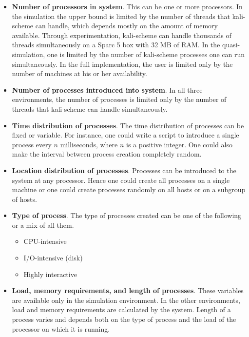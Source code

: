 \documentclass{report}
\begin{document}
\begin{itemize}

	\item \textbf{Number of processors in system}.  This can be one or more
	processors.  In the simulation the upper bound is limited by the
	number of threads that kali-scheme can handle, which depends mostly
	on the amount of memory available.  Through experimentation, 
	kali-scheme can handle thousands of threads simultaneously on a
	Sparc 5 box with 32 MB of RAM.  In the quasi-simulation, one is
	limited by the number of kali-scheme processes one can run
	simultaneously.  In the full implementation, the user is limited only
	by the number of machines at his or her availability.

	\item \textbf{Number of processes introduced into system}.  In all
	three environments, the number of processes is limited only by the
	number of threads that kali-scheme can handle simultaneously.

	\item \textbf{Time distribution of processes}.  The time distribution
	of processes can be fixed or variable.  For instance, one could
	write a script to introduce a single process every $n$ milliseconds,
	where $n$ is a positive integer.  One could also make the interval
	between process creation completely random.

	\item \textbf{Location distribution of processes}.  Processes can be
	introduced to the system at any processor.  Hence one could create
	all processes on a single machine or one could create processes
	randomly on all hosts or on a subgroup of hosts.

	\item \textbf{Type of process}.  The type of processes created can
	be one of the following or a mix of all them.

	\begin{itemize}
		\item CPU-intensive
		\item I/O-intensive (disk)
		\item Highly interactive
	\end{itemize}

	\item \textbf{Load, memory requirements, and length of processes}.
	These variables are available only in the simulation environment.
	In the other environments, load and memory requirements are
	calculated by the system.  Length of a process varies and depends
	both on the type of process and the load of the processor on which
	it is running.


\end{itemize}
\end{document}

